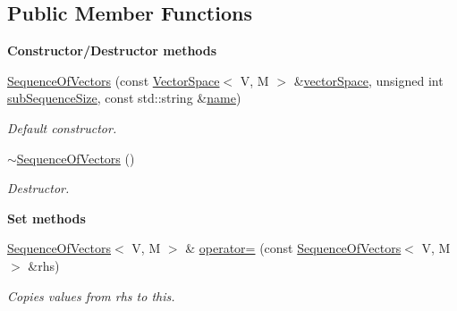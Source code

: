 \subsection*{Public Member Functions}
\begin{Indent}{\bf Constructor/\-Destructor methods}\par
\begin{DoxyCompactItemize}
\item 
\hyperlink{class_q_u_e_s_o_1_1_sequence_of_vectors_ad21c05cd3ffeda23a00c4d49922f5328}{Sequence\-Of\-Vectors} (const \hyperlink{class_q_u_e_s_o_1_1_vector_space}{Vector\-Space}$<$ V, M $>$ \&\hyperlink{class_q_u_e_s_o_1_1_base_vector_sequence_af9a4dd979a2fa8dee85bb07793b59ba2}{vector\-Space}, unsigned int \hyperlink{class_q_u_e_s_o_1_1_sequence_of_vectors_a0224bd3e961d86af5d2886301c0c2b86}{sub\-Sequence\-Size}, const std\-::string \&\hyperlink{class_q_u_e_s_o_1_1_base_vector_sequence_a48f6fe02cf77f4233d3bcdfef3870f19}{name})
\begin{DoxyCompactList}\small\item\em Default constructor. \end{DoxyCompactList}\item 
\hyperlink{class_q_u_e_s_o_1_1_sequence_of_vectors_ad859bd4cb69f5614854a39a9b615f0ba}{$\sim$\-Sequence\-Of\-Vectors} ()
\begin{DoxyCompactList}\small\item\em Destructor. \end{DoxyCompactList}\end{DoxyCompactItemize}
\end{Indent}
\begin{Indent}{\bf Set methods}\par
\begin{DoxyCompactItemize}
\item 
\hyperlink{class_q_u_e_s_o_1_1_sequence_of_vectors}{Sequence\-Of\-Vectors}$<$ V, M $>$ \& \hyperlink{class_q_u_e_s_o_1_1_sequence_of_vectors_a039ec936b424d16166dd842511891c4e}{operator=} (const \hyperlink{class_q_u_e_s_o_1_1_sequence_of_vectors}{Sequence\-Of\-Vectors}$<$ V, M $>$ \&rhs)
\begin{DoxyCompactList}\small\item\em Copies values from {\ttfamily rhs} to {\ttfamily this}. \end{DoxyCompactList}\end{DoxyCompactItemize}
\end{Indent}
